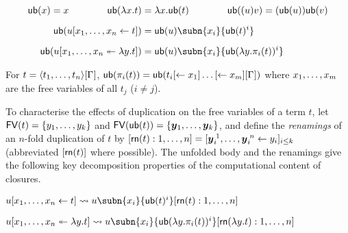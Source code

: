 \documentclass[orivec]{llncs}
\begin{document}
\begin{ALproposition}
\[
\begin{aligned}
	\sn(x) = x \quads4
	\sn(\lambda x.t) & =\lambda x.\sn(t) \quads4
	\sn((u)v) = (\sn(u))\sn(v)
\\[5pt]
   \sn(u\share xt) & =\sn(u)\subn{x_i}{\sn(t)^i}
\\[5pt]
	\sn(u\distr xyt) &=\sn(u)\subn{x_i}{\sn(\lambda y.\pi_i(t))^i}
\end{aligned}
\]
\end{ALproposition}


\begin{ALproposition}\label{prop:sn_pi}
For $t=\tup t\G$, $\sn(\pi_i(t))=\sn(t_i\share*{}{x_1}\dots\share*{}{x_m}\G)$ where
$\vv[m]x$ are the free variables of all $t_j$ ($i\neq j$).
\end{ALproposition}


%
To characterise the effects of duplication on the free variables of a term $t$, let ${\mathop{\mathsf{FV}}}(t)=\{y_1,\dots,y_k\}$ and $\FV(\sn(t))=\{\vv*y_1,\dotsc,\vv*y_k\}$, and define the \emph{renamings} of an $n$-fold duplication of $t$ by $[\sh (t):1,\dots,n] = \share*{\vv*y_i^{\;1},\dots,\vv*y_i^{\;n}}{y_i}_{i\leq k}$ (abbreviated $[{\mathsf{rn}}(t)]$ where possible).
%
The unfolded body and the renamings give the following key decomposition properties of the computational content of closures.
%
%
%
%


\begin{ALlemma}
\label{lem:unsharing}
$u\share xt \rewrite u\subn{x_i}{\sn(t)^i}[\sh (t):1,\dots,n]$
\end{ALlemma}

\begin{ALlemma}
\label{lem:undist}
$u\distr xyt \rewrite u\subn{x_i}{\sn(\lambda y.\pi_i(t))^i}[\sh (\lambda y.t):1,\dots,n]$
\end{ALlemma}
\end{document}
